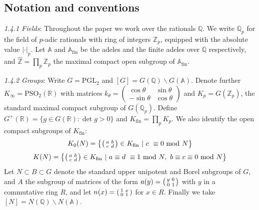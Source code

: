 \documentclass{article}
\numberwithin{equation}{section}
\begin{document}
\subsection{Notation and conventions}
\emph{1.4.1 Fields}: Throughout the paper we work over the rationals $\mathbb{Q}$. We write $\mathbb{Q}_p$ for the field of $p$-adic rationals with ring of integers $\mathbb{Z}_p$, equipped with the absolute value $|\cdot|_p$. Let $\mathbb{A}$ and $\mathbb{A}_\text{fin}$ be the adeles and the finite adeles over $\mathbb{Q}$ respectively, and $\widehat{\mathbb{Z}}=\prod_p\mathbb{Z}_p$ the maximal compact open subgroup of $\mathbb{A}_\text{fin}$. \bigbreak

\noindent \emph{1.4.2 Groups}: Write $G = \text{PGL}_2$ and $[G]=G(\mathbb{Q})\backslash G(\mathbb{A})$. Denote further $K_\infty = \text{PSO}_2(\mathbb{R})$ with matrices $k_\theta=\begin{pmatrix}
    \cos \theta & \sin \theta \\ -\sin \theta & \cos \theta
\end{pmatrix} $ and $K_p = G(\mathbb{Z}_p)$, the standard maximal compact subgroup of $G(\mathbb{Q}_p)$. Define $G^+(\mathbb{R})=\{g\in G(\mathbb{R}):\det g >0\}$ and $K_\text{fin}=\prod_pK_p$. We also identify the open compact subgroups of $K_\text{fin}$:
$$K_0(N) = \left\{\begin{psmallmatrix}
    a & b \\ c & d
\end{psmallmatrix} \in K_\text{fin}\ \vert \ c\ \equiv 0\ \text{mod}\ N \right\}$$
$$ K(N) = \left\{\begin{psmallmatrix}
    a & b \\ c & d
\end{psmallmatrix} \in K_\text{fin}\ \vert \ a\equiv d\ \equiv 1\ \text{mod}\ N, \ b\equiv c \equiv 0 \ \text{mod} \ N  \right\}$$
Let $N \subset B \subset G$ denote the standard upper unipotent and Borel subgroups of $G$, and $A$ the subgroup of matrices of the form $a(y)=\begin{psmallmatrix}
    y & 0 \\ 0 & 1
\end{psmallmatrix}$ with $y$ in a commutative ring $R$, and let $n(x)=\begin{psmallmatrix}
    1 & x \\ 0 & 1
\end{psmallmatrix}$ for $x \in R$. Finally we take $[N]=N(\mathbb{Q})\backslash N(\mathbb{A})$. \bigbreak 
\end{document}
